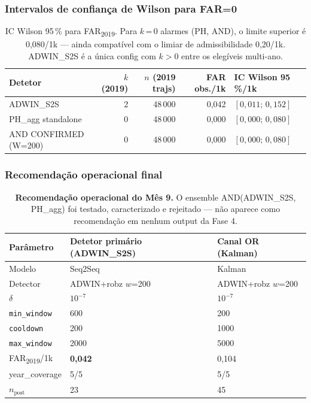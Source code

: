 \documentclass[11pt,a4paper]{article}
\begin{document}
\subsubsection{Intervalos de confian\c{c}a de Wilson para FAR=0}

\begin{table}[H]
\centering\small
\begin{tabular}{l r r r l}
\toprule
\textbf{Detetor} & \textbf{$k$ (2019)} & \textbf{$n$ (2019 trajs)} & \textbf{FAR obs./1k} & \textbf{IC Wilson 95\,\%/1k} \\
\midrule
ADWIN\_S2S          & 2 & 48\,000 & 0{,}042 & $[0{,}011;\,0{,}152]$ \\
PH\_agg standalone  & 0 & 48\,000 & 0{,}000 & $[0{,}000;\,0{,}080]$ \\
AND CONFIRMED (W=200) & 0 & 48\,000 & 0{,}000 & $[0{,}000;\,0{,}080]$ \\
\bottomrule
\end{tabular}
\caption{IC Wilson 95\,\% para FAR\textsubscript{2019}. Para
         $k$\,=\,0 alarmes (PH, AND), o limite superior \'e
         0{,}080/1k --- ainda compat\'ivel com o limiar de
         admissibilidade 0{,}20/1k. ADWIN\_S2S \'e a \'unica config
         com $k\!>\!0$ entre os eleg\'iveis multi-ano.}
\label{tab:m9_p4_wilson}
\end{table}

\subsubsection{Recomenda\c{c}\~ao operacional final}

\begin{table}[H]
\centering\small
\begin{tabular}{l l l}
\toprule
\textbf{Par\^ametro} & \textbf{Detetor prim\'ario (ADWIN\_S2S)} & \textbf{Canal OR (Kalman)} \\
\midrule
Modelo           & Seq2Seq & Kalman \\
Detector         & ADWIN+robz $w$=200 & ADWIN+robz $w$=200 \\
$\delta$         & $10^{-7}$ & $10^{-7}$ \\
\texttt{min\_window}   & 600  & 200 \\
\texttt{cooldown}      & 200  & 1000 \\
\texttt{max\_window}   & 2000 & 5000 \\
FAR\textsubscript{2019}/1k    & \textbf{0{,}042} & 0{,}104 \\
year\_coverage   & 5/5 & 5/5 \\
$n_\text{post}$  & 23 & 45 \\
\bottomrule
\end{tabular}
\caption{\textbf{Recomenda\c{c}\~ao operacional do M\^es 9.}
         O ensemble AND(ADWIN\_S2S, PH\_agg) foi testado, caracterizado
         e rejeitado --- n\~ao aparece como recomenda\c{c}\~ao em
         nenhum output da Fase 4.}
\label{tab:m9_recommendation}
\end{table}
\end{document}
